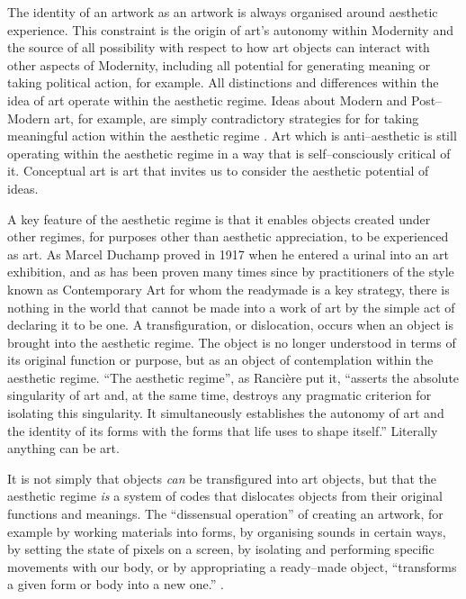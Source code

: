 \documentclass[letterpaper]{article}
\begin{document}
    The identity of an artwork as an artwork is always organised around aesthetic experience. This constraint is the origin of art's autonomy within Modernity and the source of all possibility with respect to how art objects can interact with other aspects of Modernity, including all potential for generating meaning or taking political action, for example. All distinctions and differences within the idea of art operate within the aesthetic regime. Ideas about Modern and Post–Modern art, for example, are simply contradictory strategies for for taking meaningful action within the aesthetic regime \citep[p213]{ZepkeSblmArt2017}. Art which is anti–aesthetic is still operating within the aesthetic regime in a way that is self–consciously critical of it. Conceptual art is art that invites us to consider the aesthetic potential of ideas.

    A key feature of the aesthetic regime is that it enables objects created under other regimes, for purposes other than aesthetic appreciation, to be experienced as art. As Marcel Duchamp proved in 1917 when he entered a urinal into an art exhibition, and as has been proven many times since by practitioners of the style known as Contemporary Art for whom the readymade is a key strategy, there is nothing in the world that cannot be made into a work of art by the simple act of declaring it to be one. A transfiguration, or dislocation, occurs when an object is brought into the aesthetic regime. The object is no longer understood in terms of its original function or purpose, but as an object of contemplation within the aesthetic regime. “The aesthetic regime”, as Rancière put it, “asserts the absolute singularity of art and, at the same time, destroys any pragmatic criterion for isolating this singularity. It simultaneously establishes the autonomy of art and the identity of its forms with the forms that life uses to shape itself.” Literally anything can be art.
    
    It is not simply that objects \emph{can} be transfigured into art objects, but that the aesthetic regime \emph{is} a system of codes that dislocates objects from their original functions and meanings. The “dissensual operation” of creating an artwork, for example by working materials into forms, by organising sounds in certain ways, by setting the state of pixels on a screen, by isolating and performing specific movements with our body, or by appropriating a ready–made object, “transforms a given form or body into a new one.” \citep[p.54]{RancierThEmncptdSpcttr2009}.
\end{document}
